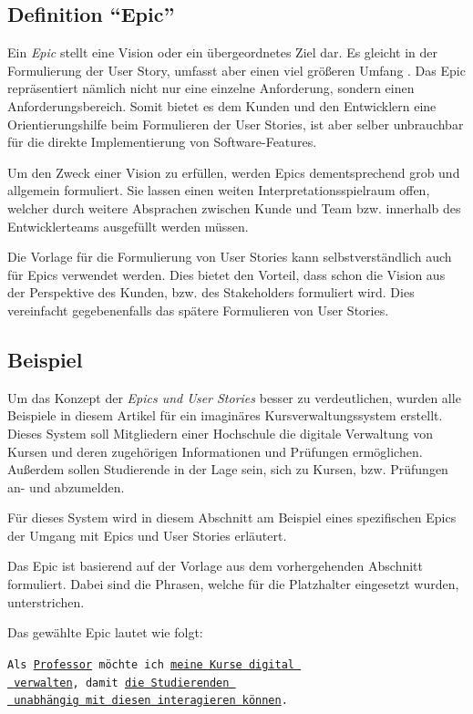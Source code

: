 \documentclass[acmtog]{acmart}
\begin{document}

\subsection{Definition ``Epic''}
Ein \emph{Epic} stellt eine Vision oder ein übergeordnetes Ziel dar.
Es gleicht in der Formulierung der User Story, umfasst aber einen viel größeren Umfang \cite[pp. 6, 14]{cohn_user_2004}.
Das Epic repräsentiert nämlich nicht nur eine einzelne Anforderung, sondern einen Anforderungsbereich.
Somit bietet es dem Kunden und den Entwicklern eine Orientierungshilfe beim Formulieren der User Stories,
ist aber selber unbrauchbar für die direkte Implementierung von Software-Features.

Um den Zweck einer Vision zu erfüllen, werden Epics dementsprechend grob und allgemein formuliert.
Sie lassen einen weiten Interpretationsspielraum offen, welcher durch weitere Absprachen zwischen
Kunde und Team bzw. innerhalb des Entwicklerteams ausgefüllt werden müssen.

Die Vorlage für die Formulierung von User Stories kann selbstverständlich auch für Epics verwendet werden.
Dies bietet den Vorteil, dass schon die Vision aus der Perspektive des Kunden, bzw. des Stakeholders formuliert
wird. Dies vereinfacht gegebenenfalls das spätere Formulieren von User Stories.

\subsection{Beispiel}
Um das Konzept der \emph{Epics und User Stories} besser zu verdeutlichen, wurden alle Beispiele in diesem
Artikel für ein imaginäres Kursverwaltungssystem erstellt.
Dieses System soll Mitgliedern einer Hochschule die digitale Verwaltung von Kursen und deren zugehörigen Informationen
und Prüfungen ermöglichen.
Außerdem sollen Studierende in der Lage sein, sich zu Kursen, bzw. Prüfungen an- und abzumelden.

Für dieses System wird in diesem Abschnitt am Beispiel eines spezifischen Epics der Umgang mit Epics und User Stories erläutert.

Das Epic ist basierend auf der Vorlage aus dem vorhergehenden Abschnitt formuliert.
Dabei sind die Phrasen, welche für die Platzhalter eingesetzt wurden, unterstrichen.

Das gewählte Epic lautet wie folgt:

\vspace{1em}
\texttt{Als \underline{Professor} möchte ich \underline{meine Kurse digital }\\
	\hspace*{3em}\underline{ verwalten}, damit \underline{die Studierenden }\\
	\hspace*{4em} \underline{ unabhängig mit diesen interagieren können}.}
\vspace{1em}
\end{document}
